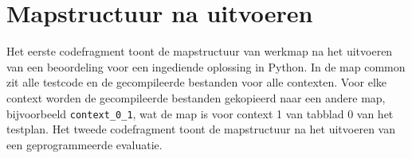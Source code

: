 \chapter{Mapstructuur na uitvoeren}\label{ch:mapstructuur-na-uitvoeren}

Het eerste codefragment toont de mapstructuur van werkmap na het uitvoeren van een beoordeling voor een ingediende oplossing in Python.
In de map common zit alle testcode en de gecompileerde bestanden voor alle contexten.
Voor elke context worden de gecompileerde bestanden gekopieerd naar een andere map, bijvoorbeeld \texttt{context\_0\_1}, wat de map is voor context 1 van tabblad 0 van het testplan.
Het tweede codefragment toont de mapstructuur na het uitvoeren van een geprogrammeerde evaluatie.

\inputminted{text}{code/dirs-python-solution.txt}

\inputminted{text}{code/dirs-python-eval.txt}
